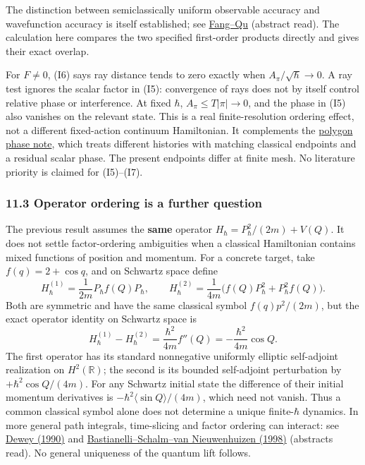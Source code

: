 \documentclass[11pt,a4paper]{article}
\begin{document}
The distinction between semiclassically uniform observable accuracy and
wavefunction accuracy is itself established; see
\href{https://doi.org/10.1137/25M1777098}{Fang--Qu} (abstract read). The
calculation here compares the two specified first-order products
directly and gives their exact overlap.

For \(F\ne0\), (I6) says ray distance tends to zero exactly when
\(A_\pi/\sqrt\hbar\to0\). A ray test ignores the scalar factor in (I5):
convergence of rays does not by itself control relative phase or
interference. At fixed \(\hbar\), \(A_\pi\le T|\pi|\to0\), and the phase
in (I5) also vanishes on the relevant state. This is a real
finite-resolution ordering effect, not a different fixed-action
continuum Hamiltonian. It complements the
\href{cut-measure-newton.md\#weyl-lifting-and-polygon-phases}{polygon
phase note}, which treats different histories with matching classical
endpoints and a residual scalar phase. The present endpoints differ at
finite mesh. No literature priority is claimed for (I5)--(I7).

\hypertarget{operator-ordering-is-a-further-question}{%
\subsubsection{11.3 Operator ordering is a further
question}\label{operator-ordering-is-a-further-question}}

The previous result assumes the \textbf{same} operator
\(H_\hbar=P_\hbar^2/(2m)+V(Q)\). It does not settle factor-ordering
ambiguities when a classical Hamiltonian contains mixed functions of
position and momentum. For a concrete target, take \(f(q)=2+\cos q\),
and on Schwartz space define \[
 H_\hbar^{(1)}=\frac1{2m}P_\hbar f(Q)P_\hbar,\qquad
 H_\hbar^{(2)}
 =\frac1{4m}\big(f(Q)P_\hbar^2+P_\hbar^2f(Q)\big). \tag{I8}
\] Both are symmetric and have the same classical symbol
\(f(q)p^2/(2m)\), but the exact operator identity on Schwartz space is
\[
 H_\hbar^{(1)}-H_\hbar^{(2)}
 =\frac{\hbar^2}{4m}f''(Q)
 =-\frac{\hbar^2}{4m}\cos Q. \tag{I9}
\] The first operator has its standard nonnegative uniformly elliptic
self-adjoint realization on \(H^2(\mathbb R)\); the second is its
bounded self-adjoint perturbation by \(+\hbar^2\cos Q/(4m)\). For any
Schwartz initial state the difference of their initial momentum
derivatives is \(-\hbar^2\langle\sin Q\rangle/(4m)\), which need not
vanish. Thus a common classical symbol alone does not determine a unique
finite-\(\hbar\) dynamics. In more general path integrals, time-slicing
and factor ordering can interact: see
\href{https://doi.org/10.1103/PhysRevA.42.32}{Dewey (1990)} and
\href{https://doi.org/10.1103/PhysRevD.58.044002}{Bastianelli--Schalm--van
Nieuwenhuizen (1998)} (abstracts read). No general uniqueness of the
quantum lift follows.
\end{document}
